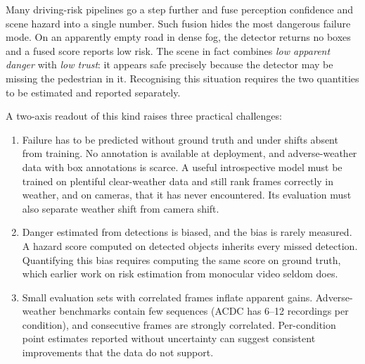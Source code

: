 \documentclass[pdflatex,sn-mathphys-num]{sn-jnl}
\begin{document}
Many driving-risk pipelines go a step further and fuse perception confidence and scene hazard into a single number. Such fusion hides the most dangerous failure mode. On an apparently empty road in dense fog, the detector returns no boxes and a fused score reports low risk. The scene in fact combines \emph{low apparent danger} with \emph{low trust}: it appears safe precisely because the detector may be missing the pedestrian in it. Recognising this situation requires the two quantities to be estimated and reported separately.

A two-axis readout of this kind raises three practical challenges:
\begin{enumerate}
\item[(i)] Failure has to be predicted without ground truth and under shifts absent from training. No annotation is available at deployment, and adverse-weather data with box annotations is scarce. A useful introspective model must be trained on plentiful clear-weather data and still rank frames correctly in weather, and on cameras, that it has never encountered. Its evaluation must also separate weather shift from camera shift.
\item[(ii)] Danger estimated from detections is biased, and the bias is rarely measured. A hazard score computed on detected objects inherits every missed detection. Quantifying this bias requires computing the same score on ground truth, which earlier work on risk estimation from monocular video seldom does.
\item[(iii)] Small evaluation sets with correlated frames inflate apparent gains. Adverse-weather benchmarks contain few sequences (ACDC has 6--12 recordings per condition), and consecutive frames are strongly correlated. Per-condition point estimates reported without uncertainty can suggest consistent improvements that the data do not support.
\end{enumerate}
\end{document}
